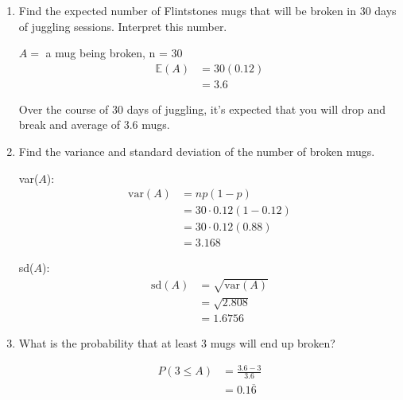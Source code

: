     \begin{enumerate}[label=(\alph*)]
        \item Find the expected number of Flintstones mugs that will be broken in 30 days of
        juggling sessions. Interpret this number.
        \\
        \begin{mdframed}
            $A = $ a mug being broken, n = 30
            \begin{align*}
                \mathbb{E}(A)           & = 30(0.12)    \\
                                        & = \boxed{3.6}
            \end{align*}

            Over the course of 30 days of juggling, it's expected that you will drop and break and average of 3.6 mugs.
        \end{mdframed}

        \item Find the variance and standard deviation of the number of broken mugs.
        \\
        \begin{mdframed}
            var($A$):
            \begin{align*}
                \text{var}(A)   & = np(1 - p)               \\
                                & = 30 \cdot 0.12(1-0.12)   \\
                                & = 30 \cdot 0.12(0.88)     \\
                                & = \boxed{3.168}
            \end{align*}

            sd($A$):
            \begin{align*}
                \text{sd}(A)    & = \sqrt{\text{var}(A)}    \\
                                & = \sqrt{2.808}            \\
                                & = \boxed{1.6756}
            \end{align*}
        \end{mdframed}

        \item What is the probability that at least 3 mugs will end up broken?
        \\
        \begin{mdframed}
            \begin{align*}
                P(3 \leq A)     & = \frac{3.6 - 3}{3.6}     \\
                                & = \boxed{0.1\overline{6}}
            \end{align*}
        \end{mdframed}


\end{enumerate}
